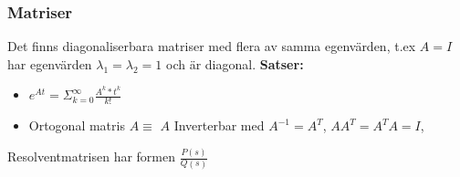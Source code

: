 \documentclass[twocolumn,a4paper]{article}
\begin{document}
\subsubsection*{Matriser}
Det finns diagonaliserbara matriser med flera av samma egenvärden, t.ex $A = I$ har egenvärden $\lambda_1 = \lambda_2 = 1$ och är diagonal.
\newline
\textbf{Satser:}
\begin{itemize}
    \item $e^{At} = \Sigma^{\infty}_{k=0} \frac{A^k*t^k}{k!}$
    \item Ortogonal matris $A \equiv$ $A$ Inverterbar med $A^{-1}=A^T$, $AA^T=A^TA=I$, %
    
\end{itemize}

Resolventmatrisen har formen $\frac{P(s)}{Q(s)}$
\end{document}
